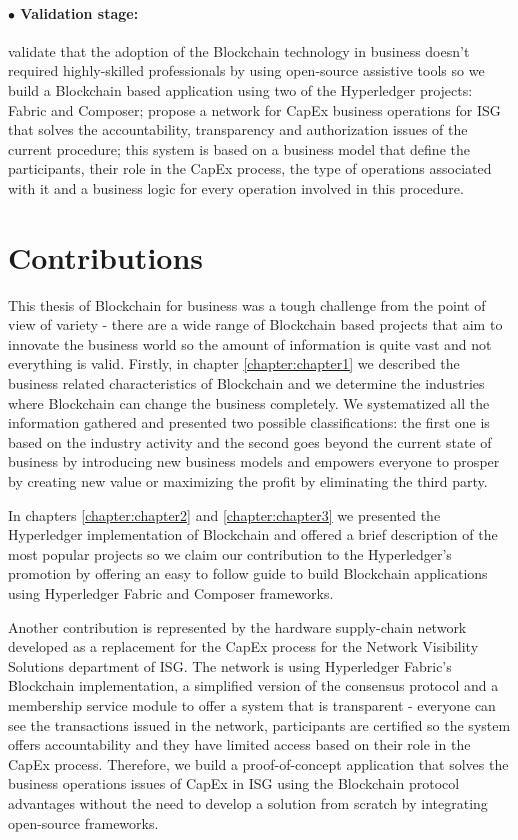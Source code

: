 \paragraph{$\bullet$ Validation stage:} validate that the adoption of the Blockchain technology in business doesn't required highly-skilled professionals by using open-source assistive tools so we build a Blockchain based application using two of the Hyperledger projects: Fabric and Composer; propose a network for CapEx business operations for ISG that solves the accountability, transparency and authorization issues of the current procedure; this system is based on a business model that define the participants, their role in the CapEx process, the type of operations associated with it and a business logic for every operation involved in this procedure.

\section{Contributions}
\label{sec:intro-sec3}
This thesis of Blockchain for business was a tough challenge from the point of view of variety - there are a wide range of Blockchain based projects that aim to innovate the business world so the amount of information is quite vast and not everything is valid. Firstly, in chapter \ref{chapter:chapter1} we described the business related characteristics of Blockchain and we determine the industries where Blockchain can change the business completely. We systematized all the information gathered and presented two possible classifications: the first one is based on the industry activity and the second goes beyond the current state of business by introducing new business models and empowers everyone to prosper by creating new value or maximizing the profit by eliminating the third party.  

In chapters \ref{chapter:chapter2} and \ref{chapter:chapter3} we presented the Hyperledger implementation of Blockchain and offered a brief description of the most popular projects so we claim our contribution to the Hyperledger's promotion by offering an easy to follow guide to build Blockchain applications using Hyperledger Fabric and Composer frameworks.

Another contribution is represented by the hardware supply-chain network developed as a replacement for the CapEx process for the Network Visibility Solutions department of ISG. The network is using Hyperledger Fabric's Blockchain implementation, a simplified version of the consensus protocol and a membership service module to offer a system that is transparent - everyone can see the transactions issued in the network, participants are certified so the system offers accountability and they have limited access based on their role in the CapEx process. Therefore, we build a proof-of-concept application that solves the business operations issues of CapEx in ISG using the Blockchain protocol advantages without the need to develop a solution from scratch by integrating open-source frameworks.
